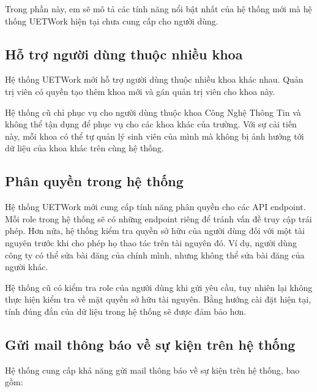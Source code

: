 \documentclass[./../main.tex]{subfiles}
\begin{document}
Trong phần này, em sẽ mô tả các tính năng nổi bật nhất của hệ thống mới
mà hệ thống UETWork hiện tại chưa cung cấp cho người dùng.

\hypertarget{hux1ed7-trux1ee3-ngux1b0ux1eddi-duxf9ng-thuux1ed9c-nhiux1ec1u-khoa}{%
\subsection{Hỗ trợ người dùng thuộc nhiều
khoa}\label{hux1ed7-trux1ee3-ngux1b0ux1eddi-duxf9ng-thuux1ed9c-nhiux1ec1u-khoa}}

Hệ thống UETWork mới hỗ trợ người dùng thuộc nhiều khoa khác nhau. Quản
trị viên có quyền tạo thêm khoa mới và gán quản trị viên cho khoa này.

Hệ thống cũ chỉ phục vụ cho người dùng thuộc khoa Công Nghệ Thông Tin và
không thể tận dụng để phục vụ cho các khoa khác của trường. Với sự cải
tiến này, mỗi khoa có thể tự quản lý sinh viên của mình mà không bị ảnh
hưởng tới dữ liệu của khoa khác trên cùng hệ thống.

\hypertarget{phuxe2n-quyux1ec1n-trong-hux1ec7-thux1ed1ng}{%
\subsection{Phân quyền trong hệ
thống}\label{phuxe2n-quyux1ec1n-trong-hux1ec7-thux1ed1ng}}

Hệ thống UETWork mới cung cấp tính năng phân quyền cho các API endpoint.
Mỗi role trong hệ thống sẽ có những endpoint riêng để tránh vấn đề truy
cập trái phép. Hơn nữa, hệ thống kiểm tra quyền sở hữu của người dùng
đối với một tài nguyên trước khi cho phép họ thao tác trên tài nguyên
đó. Ví dụ, người dùng công ty có thể sửa bài đăng của chính mình, nhưng
không thể sửa bài đăng của người khác.

Hệ thống cũ có kiểm tra role của người dùng khi gửi yêu cầu, tuy nhiên
lại không thực hiện kiểm tra về mặt quyền sở hữu tài nguyên. Bằng hướng
cài đặt hiện tại, tính đúng đắn của dữ liệu trong hệ thống sẽ được đảm
bảo hơn.

\hypertarget{gux1eedi-mail-thuxf4ng-buxe1o-vux1ec1-sux1ef1-kiux1ec7n-truxean-hux1ec7-thux1ed1ng}{%
\subsection{Gửi mail thông báo về sự kiện trên hệ
thống}\label{gux1eedi-mail-thuxf4ng-buxe1o-vux1ec1-sux1ef1-kiux1ec7n-truxean-hux1ec7-thux1ed1ng}}

Hệ thống cung cấp khả năng gửi mail thông báo về sự kiện trên hệ thống,
bao gồm:
\end{document}
